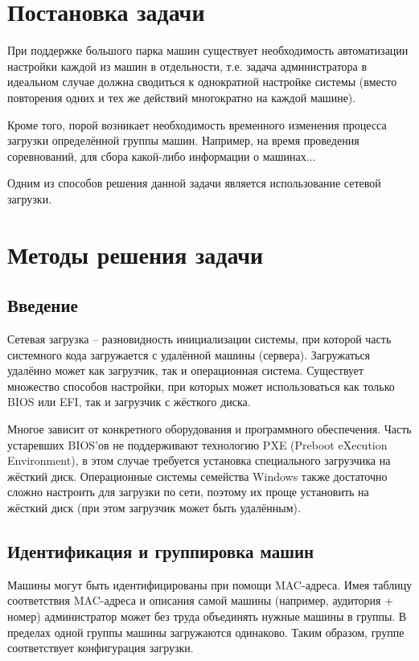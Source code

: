 \documentclass[11pt]{article}
\begin{document}
\tableofcontents
\pagebreak

\section{Постановка задачи}

При поддержке большого парка машин существует необходимость
автоматизации настройки каждой из машин в отдельности,
т.е. задача администратора в идеальном случае должна
сводиться к однократной настройке системы (вместо
повторения одних и тех же действий многократно на каждой машине).

Кроме того, порой возникает необходимость временного изменения
процесса загрузки определённой группы машин. Например, на время
проведения соревнований, для сбора какой-либо информации о машинах...

Одним из способов решения данной задачи является использование сетевой загрузки.

\section{Методы решения задачи}

\subsection{Введение}
Сетевая загрузка -- разновидность инициализации системы, при которой часть системного
кода загружается с удалённой машины (сервера). Загружаться удалённо может как загрузчик,
так и операционная система. Существует множество способов настройки, при которых
может использоваться как только BIOS или EFI, так и загрузчик с жёсткого диска.

Многое зависит от конкретного оборудования и программного обеспечения.
Часть устаревших BIOS'ов не поддерживают
технологию PXE (Preboot eXecution Environment),
в этом случае требуется установка специального загрузчика на жёсткий диск.
Операционные системы семейства Windows также достаточно сложно настроить для загрузки по сети,
поэтому их проще установить на жёсткий диск (при этом загрузчик может быть удалённым).

\subsection{Идентификация и группировка машин}
Машины могут быть идентифицированы при помощи MAC-адреса.
Имея таблицу соответствия MAC-адреса и описания самой машины
(например, аудитория + номер) администратор может без труда
объединять нужные машины в группы. В пределах одной группы
машины загружаются одинаково. Таким образом, группе соответствует
конфигурация загрузки.
\end{document}
